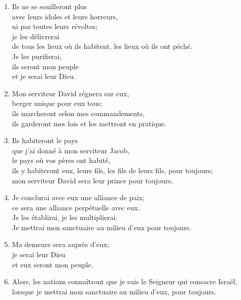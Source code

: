 \begin{enumerate}[leftmargin=\psleftmargin, labelsep = \pslabelsep, label={\arabic*}, font=\color{\pscolor}\small\textsuperscript, parsep=0em, itemsep=0em, topsep=0em ]
    \newpage
    \item Ils ne se souilleront plus \\ avec leurs idoles et leurs horreurs, \\ ni par toutes leurs révoltes; \\ je les délivrerai \\ de tous les lieux où ils habitent, les lieux où ils ont péché. \\ Je les purifierai, \\ ils seront mon peuple \\ et je serai leur Dieu.
    \item Mon serviteur David régnera sur eux, \\ berger unique pour eux tous; \\ ils marcheront selon mes commandements, \\ ils garderont mes lois et les mettront en pratique.
    \item Ils habiteront le pays \\ que j’ai donné à mon serviteur Jacob, \\ le pays où vos pères ont habité, \\ ils y habiteront eux, leurs fils, les fils de leurs fils, pour toujours; \\ mon serviteur David sera leur prince pour toujours.
    \item Je conclurai avec eux une alliance de paix; \\ ce sera une alliance perpétuelle avec eux. \\ Je les établirai, je les multiplierai. \\ Je mettrai mon sanctuaire au milieu d’eux pour toujours.
    \item Ma demeure sera auprès d’eux; \\ je serai leur Dieu \\ et eux seront mon peuple.
    \item Alors, les nations connaîtront que je suis le Seigneur qui consacre Israël, \\ lorsque je mettrai mon sanctuaire au milieu d’eux, pour toujours.
\end{enumerate}
